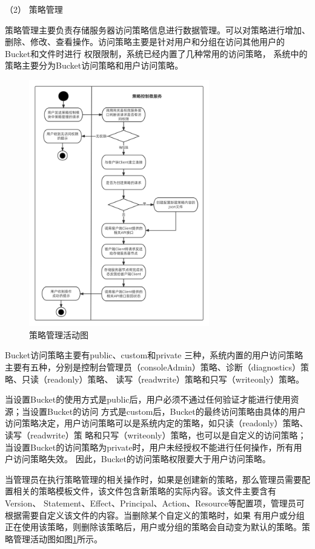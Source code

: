 （2） 策略管理

策略管理主要负责存储服务器访问策略信息进行数据管理。可以对策略进行增加、删除、修改、查看操作。访问策略主要是针对用户和分组在访问其他用户的Bucket和文件时进行
权限限制，系统已经内置了几种常用的访问策略， 系统中的策略主要分为Bucket访问策略和用户访问策略。
\begin{figure}[htb]
    \centering
    \includegraphics[width=0.7\textwidth]{my_figures/chapter4/策略管理活动图.png}
    \caption{策略管理活动图}
    \label{fig:策略管理活动图}
\end{figure} 
Bucket访问策略主要有public、custom和private
三种，系统内置的用户访问策略主要有五种，分别是控制台管理员（consoleAdmin）策略、诊断（diagnostics）策略、只读（readonly）策略、
读写（readwrite）策略和只写（writeonly）策略。

当设置Bucket的使用方式是public后，用户必须不通过任何验证才能进行使用资源；当设置Bucket的访问
方式是custom后，Bucket的最终访问策略由具体的用户访问策略决定，用户访问策略可以是系统内定的策略，如只读（readonly）策略、读写（readwrite）策
略和只写（writeonly）策略，也可以是自定义的访问策略；当设置Bucket的访问策略为private时，用户未经授权不能进行任何操作，所有用户访问策略失效。
因此，Bucket的访问策略权限要大于用户访问策略。

当管理员在执行策略管理的相关操作时，如果是创建新的策略，那么管理员需要配置相关的策略模板文件，该文件包含新策略的实际内容。该文件主要含有Version、
Statement、Effect、Principal、Action、Resource等配置项，管理员可根据需要自定义该文件的内容。当删除某个自定义的策略时，如果
有用户或分组正在使用该策略，则删除该策略后，用户或分组的策略会自动变为默认的策略。策略管理活动图如图\ref{fig:策略管理活动图}所示。


